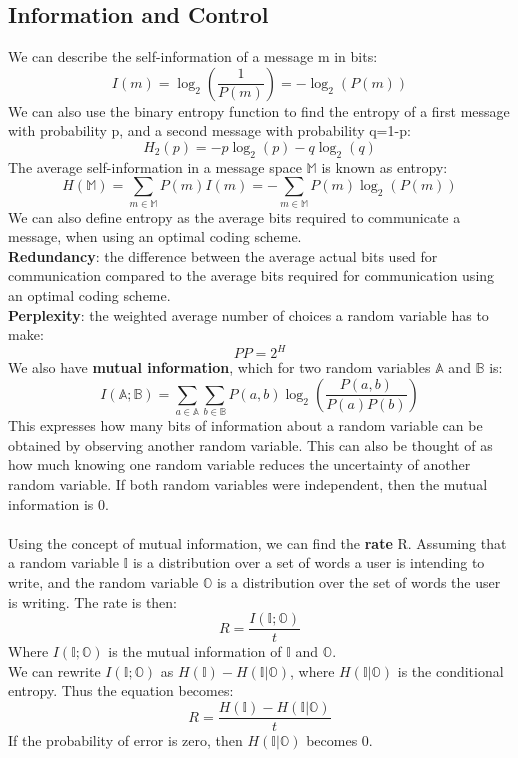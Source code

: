 \documentclass{article}
\begin{document}
\subsection{Information and Control}
We can describe the self-information of a message m in bits:
\[
I(m) = \log_2 \left(\frac{1}{P(m)} \right) = -\log_2(P(m))
\]
We can also use the binary entropy function to find the entropy of a first message with probability p, and a second message with probability q=1-p:
\[
H_2(p) = -p\log_2(p) - q\log_2(q)
\]
The average self-information in a message space $\mathbb{M}$ is known as entropy:
\[
H(\mathbb{M}) = \sum_{m \in \mathbb{M}} P(m) I(m) = - \sum_{m \in \mathbb{M}} P(m) \log_2 (P(m))
\]
We can also define entropy as the average bits required to communicate a message, when using an optimal coding scheme. \\
\textbf{Redundancy}: the difference between the average actual bits used for communication compared to the average bits required for communication using an optimal coding scheme. \\
\textbf{Perplexity}: the weighted average number of choices a random variable has to make:
\[
PP = 2^H
\]
We also have \textbf{mutual information}, which for two random variables $\mathbb{A}$ and $\mathbb{B}$ is:
\[
I(\mathbb{A}; \mathbb{B}) = \sum_{a \in \mathbb{A}} \sum_{b \in \mathbb{B}} P(a,b) 
\log_2 \left( \frac{P(a,b)}{P(a)P(b)} \right)
\]
This expresses how many bits of information about a random variable can be obtained by observing another random variable. This can also be thought of as how much knowing one random variable reduces the uncertainty of another random variable. If both random variables were independent, then the mutual information is 0. \\ \\
Using the concept of mutual information, we can find the \textbf{rate} R. Assuming that a random variable $\mathbb{I}$ is a distribution over a set of words a user is intending to write, and the random variable $\mathbb{O}$ is a distribution over the set of words the user is writing. The rate is then:
\[
R = \frac{I(\mathbb{I; O})}{t}
\]
Where $I(\mathbb{I; O})$ is the mutual information of $\mathbb I$ and $\mathbb O$. \\
We can rewrite $I(\mathbb{I; O})$ as $H(\mathbb I) - H(\mathbb I | \mathbb O)$, where $H(\mathbb I | \mathbb O)$ is the conditional entropy. Thus the equation becomes:
\[
R = \frac{H(\mathbb I) - H(\mathbb I | \mathbb O)}{t}
\]
If the probability of error is zero, then $H(\mathbb I | \mathbb O)$ becomes 0.
\end{document}
